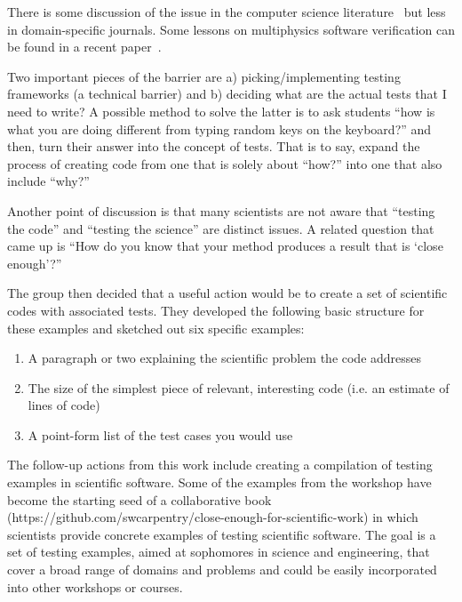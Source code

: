 \documentclass[11pt, oneside]{amsart}
\newcommand{\katznote}[1]{ {\textcolor{magenta}    { ***Dan:      #1 }}}
\newcommand{\clunenote}[1]{ {\textcolor{orange}    { ***Tom:      #1 }}}
\begin{document}

%

There is some discussion of the issue in the computer science literature~\cite{hook1,hook2} but less in domain-specific journals. Some lessons on multiphysics software verification can be found in a recent paper~\cite{dubey-FLASH}.

Two important pieces of the barrier are a) picking/implementing testing frameworks (a technical barrier) and b) deciding what are the actual tests that I need to write?  A possible method to solve the latter is to ask students ``how is what you are doing different from typing random keys on the keyboard?'' and then, turn their answer into the concept of tests.  That is to say, expand the process of creating code from one that is solely about ``how?'' into one that also include ``why?''

Another point of discussion is that many scientists are not aware that ``testing the code'' and ``testing the science'' are distinct issues.  A related question that came up is ``How do you know that your method produces a result that is `close enough'?''

The group then decided that a useful action would be to create a set of scientific codes
with associated tests. They developed the following basic structure for these examples 
and sketched out six specific examples:
\begin{enumerate}
\item A paragraph or two explaining the scientific problem the code addresses
\item The size of the simplest piece of relevant, interesting code (i.e. an estimate of lines of code)
\item A point-form list of the test cases you would use
\end{enumerate}

The follow-up actions from this work include creating a compilation of testing examples in scientific software. Some of the examples from the workshop have become the starting seed of a collaborative book (https://github.com/swcarpentry/close-enough-for-scientific-work) in which scientists provide concrete examples of testing scientific software. The goal is a set of testing examples, aimed at sophomores in science and engineering, that cover a broad range of domains and problems and could be easily incorporated into other workshops or courses.
 
\end{document}
